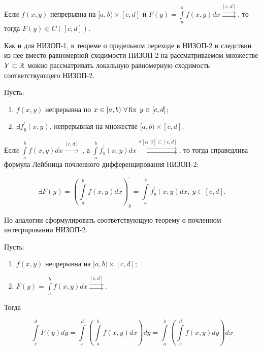 \documentclass[../../main.tex]{subfiles}
\begin{document}
	\begin{crl*}
		Если $f(x, y)$ непрерывна на $[a, b) \times [c, d]$ и $F(y) = 
		\int\limits_a^b f(x, y) dx \overset{[c, d]}\rightrightarrows$, то тогда 
		$F(y) \in C([c, d])$.
	\end{crl*}

	\begin{rem}
		Как и для НИЗОП-1, в теореме о предельном переходе в НИЗОП-2 и следствии из 
		нее вместо равномерной сходимости НИЗОП-2 на рассматриваемом множестве $Y 
		\subset \mathbb{R}$ можно рассматривать локальную равномерную сходимость 
		соответствующего НИЗОП-2.
	\end{rem}

	\begin{thm}
		Пусть:

		\begin{enumerate}
			\item $f(x, y)$ непрерывна по $x \in [a, b)\ \forall \operatorname{fix} \; y \in [c, d]$;
			\item $\exists f^{'}_{y} (x, y)$, непрерывная на множестве $[a, b) \times 
			[c, d]$.
		\end{enumerate}

		Если $\int\limits_a^b f(x, y) dx \overset{[c, d]}\rightarrow\;$, а 
		$\int\limits_a^b f^{'}_y (x, y) dx \overset{\forall [\alpha, \beta] \subset 
		[c, d]}{\rightrightarrows}$, то тогда справедлива формула Лейбница 
		почленного дифференцирования НИЗОП-2:
		
		\[
		\exists F(y) = \left( \int\limits_a^b f(x, y) dx \right)^{'}_y = 
		\int\limits_a^b f^{'}_y (x, y) dx, \ y \in [c, d].
		\]
	\end{thm}

	\begin{exc}
		По аналогии сформулировать соответствующую теорему о почленном 
		интегрировании НИЗОП-2.
	\end{exc}

	\begin{eans}
		Пусть:
		\begin{enumerate}
			\item $f(x, y)$ непрерывна на $[a, b) \times [c, d];$
			\item $F(y) = \int\limits_a^b f(x, y) dx \overset{[c, 
			d]}{\rightrightarrows}.$
		\end{enumerate}
	
		Тогда
		
		\[
			\int\limits_c^d F(y) dy = \int\limits_c^d \left( \int\limits_a^b f(x, y) dx 
			\right) dy = \int\limits_a^b \left( \int\limits_c^d f(x, y) dy \right) dx
		\]
	
	\end{eans}
\end{document}

